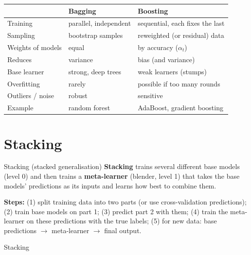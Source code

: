 \begin{center}
\small
\begin{tabular}{@{}p{3cm}p{6.6cm}p{6.6cm}@{}}
\toprule
 & \textbf{Bagging} & \textbf{Boosting}\\
\midrule
Training & parallel, independent & sequential, each fixes the last\\
Sampling & bootstrap samples & reweighted (or residual) data\\
Weights of models & equal & by accuracy ($\alpha_t$)\\
Reduces & variance & bias (and variance)\\
Base learner & strong, deep trees & weak learners (stumps)\\
Overfitting & rarely & possible if too many rounds\\
Outliers / noise & robust & sensitive\\
Example & random forest & AdaBoost, gradient boosting\\
\bottomrule
\end{tabular}
\end{center}

\section{Stacking}
\begin{dfn}{Stacking (stacked generalisation)}
\textbf{Stacking} trains several different base models (level 0) and then trains a \textbf{meta-learner} (blender, level 1) that takes the base models' predictions as its inputs and learns how best to combine them.
\end{dfn}
\textbf{Steps:} (1) split training data into two parts (or use cross-validation predictions); (2) train base models on part 1; (3) predict part 2 with them; (4) train the meta-learner on these predictions with the true labels; (5) for new data: base predictions $\to$ meta-learner $\to$ final output.

\begin{drawit}{Stacking}
\centering
{}
\end{drawit}

